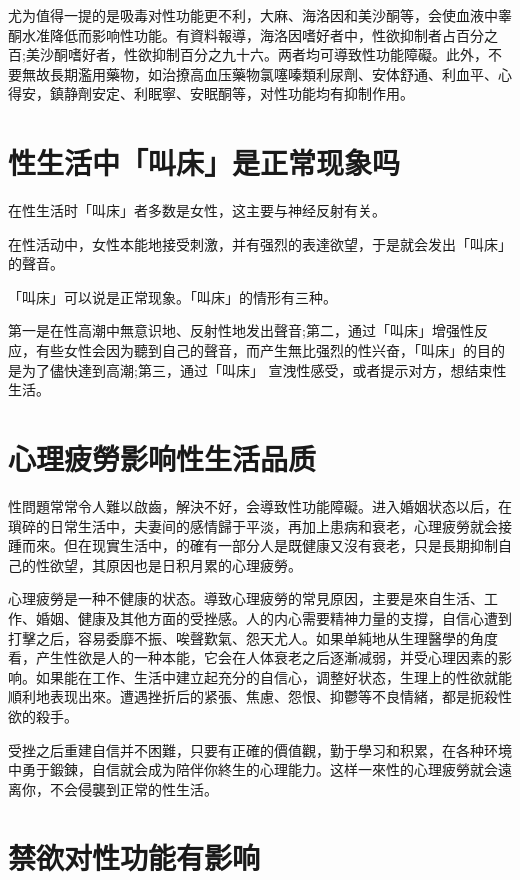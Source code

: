 \documentclass[12pt,UTF8]{ctexbook}
\begin{document}
尤为值得一提的是吸毒对性功能更不利，大麻、海洛因和美沙酮等，会使血液中睾酮水准降低而影响性功能。有資料報導，海洛因嗜好者中，性欲抑制者占百分之百;美沙酮嗜好者，性欲抑制百分之九十六。两者均可導致性功能障礙。此外，不要無故長期濫用藥物，如治撩高血压藥物氯噻嗪類利尿劑、安体舒通、利血平、心得安，鎮静劑安定、利眠寧、安眠酮等，对性功能均有抑制作用。

\section{性生活中「叫床」是正常现象吗}

在性生活时「叫床」者多数是女性，这主要与神经反射有关。

在性活动中，女性本能地接受刺激，并有强烈的表達欲望，于是就会发出「叫床」的聲音。

「叫床」可以说是正常现象。「叫床」的情形有三种。

第一是在性高潮中無意识地、反射性地发出聲音;第二，通过「叫床」增强性反应，有些女性会因为聽到自己的聲音，而产生無比强烈的性兴奋，「叫床」的目的是为了儘快達到高潮;第三，通过「叫床」
宣洩性感受，或者提示对方，想结束性生活。

\section{心理疲勞影响性生活品质}

性問題常常令人難以啟齒，解決不好，会導致性功能障礙。进入婚姻状态以后，在瑣碎的日常生活中，夫妻间的感情歸于平淡，再加上患病和衰老，心理疲勞就会接踵而來。但在现實生活中，的確有一部分人是既健康又沒有衰老，只是長期抑制自己的性欲望，其原因也是日积月累的心理疲勞。

心理疲勞是一种不健康的状态。導致心理疲勞的常見原因，主要是來自生活、工作、婚姻、健康及其他方面的受挫感。人的内心需要精神力量的支撐，自信心遭到打擊之后，容易委靡不振、唉聲歎氣、怨天尤人。如果单純地从生理醫學的角度看，产生性欲是人的一种本能，它会在人体衰老之后逐漸减弱，并受心理因素的影响。如果能在工作、生活中建立起充分的自信心，调整好状态，生理上的性欲就能順利地表现出來。遭遇挫折后的紧張、焦慮、怨恨、抑鬱等不良情緒，都是扼殺性欲的殺手。

受挫之后重建自信并不困難，只要有正確的價值觀，勤于學习和积累，在各种环境中勇于鍛鍊，自信就会成为陪伴你終生的心理能力。这样一來性的心理疲勞就会遠离你，不会侵襲到正常的性生活。

\section{禁欲对性功能有影响}
\end{document}
